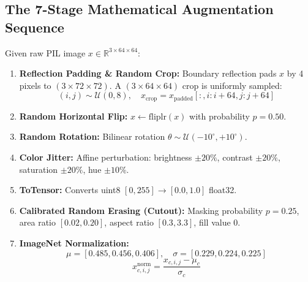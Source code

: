 \documentclass[11pt,a4paper]{article}
\begin{document}
\subsection{The 7-Stage Mathematical Augmentation Sequence}
Given raw PIL image $x \in \mathbb{R}^{3 \times 64 \times 64}$:
\begin{enumerate}
    \item \textbf{Reflection Padding \& Random Crop:} Boundary reflection pads $x$ by 4 pixels to $(3 \times 72 \times 72)$. A $(3 \times 64 \times 64)$ crop is uniformly sampled:
    \begin{equation}
    (i, j) \sim \mathcal{U}(0, 8), \quad x_{\text{crop}} = x_{\text{padded}}[:, i:i+64, j:j+64]
    \end{equation}
    \item \textbf{Random Horizontal Flip:} $x \leftarrow \text{fliplr}(x)$ with probability $p = 0.50$.
    \item \textbf{Random Rotation:} Bilinear rotation $\theta \sim \mathcal{U}(-10^\circ, +10^\circ)$.
    \item \textbf{Color Jitter:} Affine perturbation: brightness $\pm 20\%$, contrast $\pm 20\%$, saturation $\pm 20\%$, hue $\pm 10\%$.
    \item \textbf{ToTensor:} Converts uint8 $[0, 255] \to [0.0, 1.0]$ float32.
    \item \textbf{Calibrated Random Erasing (Cutout):} Masking probability $p = 0.25$, area ratio $[0.02, 0.20]$, aspect ratio $[0.3, 3.3]$, fill value $0$.
    \item \textbf{ImageNet Normalization:}
    \begin{equation}
    \mu = [0.485, 0.456, 0.406], \quad \sigma = [0.229, 0.224, 0.225]
    \end{equation}
    \begin{equation}
    x_{c, i, j}^{\text{norm}} = \frac{x_{c, i, j} - \mu_c}{\sigma_c}
    \end{equation}
\end{enumerate}
\end{document}
